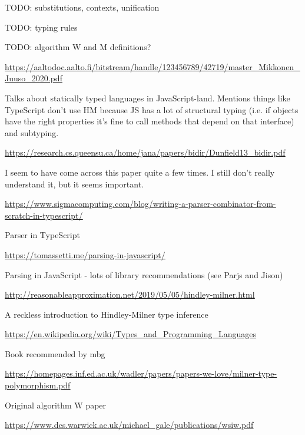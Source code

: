 \documentclass[a4paper,fleqn,12pt]{article}
\begin{document}
TODO: substitutions, contexts, unification

TODO: typing rules

TODO: algorithm W and M definitions?

\underline{\href{https://aaltodoc.aalto.fi/bitstream/handle/123456789/42719/master\_Mikkonen\_Juuso\_2020.pdf}{https://aaltodoc.aalto.fi/bitstream/handle/123456789/42719/master\_Mikkonen\_Juuso\_2020.pdf}}

Talks about statically typed languages in JavaScript-land. Mentions things like TypeScript don’t use HM because JS has a lot of structural typing (i.e. if objects have the right properties it’s fine to call methods that depend on that interface) and subtyping.

\underline{\href{https://research.cs.queensu.ca/home/jana/papers/bidir/Dunfield13\_bidir.pdf}{https://research.cs.queensu.ca/home/jana/papers/bidir/Dunfield13\_bidir.pdf}}

I seem to have come across this paper quite a few times. I still don’t really understand it, but it seems important.

\underline{\href{https://www.sigmacomputing.com/blog/writing-a-parser-combinator-from-scratch-in-typescript/}{https://www.sigmacomputing.com/blog/writing-a-parser-combinator-from-scratch-in-typescript/}}

Parser in TypeScript

\underline{\href{https://tomassetti.me/parsing-in-javascript/}{https://tomassetti.me/parsing-in-javascript/}}

Parsing in JavaScript - lots of library recommendations (see Parjs and Jison)

\underline{\href{http://reasonableapproximation.net/2019/05/05/hindley-milner.html}{http://reasonableapproximation.net/2019/05/05/hindley-milner.html}}

A reckless introduction to Hindley-Milner type inference

\underline{\href{https://en.wikipedia.org/wiki/Types\_and\_Programming\_Languages}{https://en.wikipedia.org/wiki/Types\_and\_Programming\_Languages}}

Book recommended by mbg

\underline{\href{https://homepages.inf.ed.ac.uk/wadler/papers/papers-we-love/milner-type-polymorphism.pdf}{https://homepages.inf.ed.ac.uk/wadler/papers/papers-we-love/milner-type-polymorphism.pdf}}

Original algorithm W paper

\underline{\href{https://www.dcs.warwick.ac.uk/michael\_gale/publications/wsiw.pdf}{https://www.dcs.warwick.ac.uk/michael\_gale/publications/wsiw.pdf}}
\end{document}
